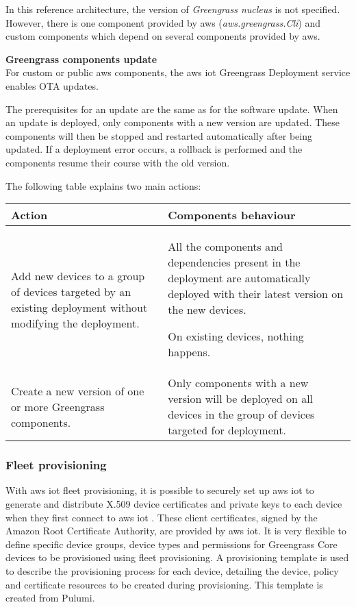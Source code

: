 In this reference architecture, the version of \textit{Greengrass nucleus} is not specified. However, there is one component provided by \gls{aws} (\textit{aws.greengrass.Cli}) and custom components which depend on several components provided by \gls{aws}.

\textbf{Greengrass components update}\\
For custom or public \gls{aws} components, the \gls{aws} \acrshort{iot} Greengrass Deployment service enables OTA updates.

The prerequisites for an update are the same as for the software update. When an update is deployed, only components with a new version are updated. These components will then be stopped and restarted automatically after being updated. If a deployment error occurs, a rollback is performed and the components resume their course with the old version.

The following table explains two main actions:

\begin{tabularx}{1\textwidth} { 
    | >{\raggedright\arraybackslash}X
    | >{\raggedright\arraybackslash}X | }
    \hline
    \rowcolor{lightgray}
    Action              & Components behaviour \\ \hline
    Add new devices to a group of devices targeted by an existing deployment without modifying the deployment.
    & All the components and dependencies present in the deployment are automatically deployed with their latest version on the new devices.
    
    On existing devices, nothing happens.\\
    \hline
    Create a new version of one or more Greengrass components.
    & Only components with a new version will be deployed on all devices in the group of devices targeted for deployment. \\
    \hline
\end{tabularx}

\subsubsection{Fleet \gls{provisioning}}
With \gls{aws} \acrshort{iot} fleet \gls{provisioning}, it is possible to securely set up \gls{aws} \acrshort{iot} to generate and distribute X.509 device certificates and private keys to each device when they first connect to \gls{aws} \acrshort{iot} \cite{aws_iot_greengrass_fleet}. These client certificates, signed by the Amazon Root Certificate Authority, are provided by \gls{aws} \acrshort{iot}. It is very flexible to define specific device groups, device types and permissions for Greengrass Core devices to be provisioned using fleet \gls{provisioning}. A \gls{provisioning} template is used to describe the \gls{provisioning} process for each device, detailing the device, policy and certificate resources to be created during \gls{provisioning}. This template is created from Pulumi.


